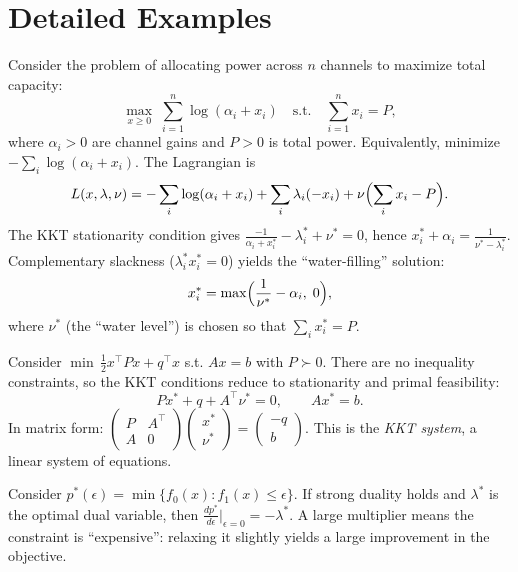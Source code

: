 \documentclass[11pt,a4paper]{article}
\begin{document}

\section{Detailed Examples}\label{sec:examples}

\begin{example}\label{ex:water-filling}
Consider the problem of allocating power across $n$ channels to maximize
total capacity:
\[
  \max_{x \ge 0} \; \sum_{i=1}^n \log(\alpha_i + x_i) \quad
  \text{s.t.} \quad \sum_{i=1}^n x_i = P,
\]
where $\alpha_i > 0$ are channel gains and $P > 0$ is total power.
Equivalently, minimize $-\sum_i \log(\alpha_i + x_i)$. The Lagrangian is
\[
  L(x, \lambda, \nu) = -\sum_i \log(\alpha_i + x_i)
  + \sum_i \lambda_i(-x_i) + \nu\Bigl(\sum_i x_i - P\Bigr).
\]
The KKT stationarity condition gives
$\frac{-1}{\alpha_i + x_i^*} - \lambda_i^* + \nu^* = 0$, hence
$x_i^* + \alpha_i = \frac{1}{\nu^* - \lambda_i^*}$. Complementary
slackness ($\lambda_i^* x_i^* = 0$) yields the ``water-filling'' solution:
\[
  x_i^* = \max\Bigl(\frac{1}{\nu^*} - \alpha_i, \; 0\Bigr),
\]
where $\nu^*$ (the ``water level'') is chosen so that $\sum_i x_i^* = P$.
\end{example}

\begin{example}\label{ex:eq-qp}
Consider $\min\, \frac{1}{2}x^\top P x + q^\top x$ s.t. $Ax = b$ with
$P \succ 0$. There are no inequality constraints, so the KKT conditions
reduce to stationarity and primal feasibility:
\[
  Px^* + q + A^\top \nu^* = 0, \qquad Ax^* = b.
\]
In matrix form:
$\begin{pmatrix} P & A^\top \\ A & 0 \end{pmatrix}
\begin{pmatrix} x^* \\ \nu^* \end{pmatrix}
= \begin{pmatrix} -q \\ b \end{pmatrix}$.
This is the \emph{KKT system}, a linear system of equations.
\end{example}

\begin{example}\label{ex:sensitivity}
Consider $p^*(\epsilon) = \min\{f_0(x) : f_1(x) \le \epsilon\}$. If strong
duality holds and $\lambda^*$ is the optimal dual variable, then
$\frac{dp^*}{d\epsilon}\big|_{\epsilon=0} = -\lambda^*$. A large multiplier
means the constraint is ``expensive'': relaxing it slightly yields a large
improvement in the objective.
\end{example}
\end{document}

